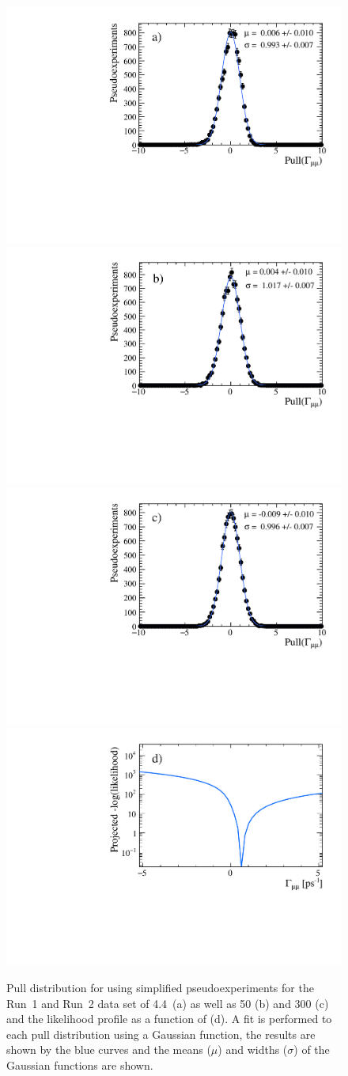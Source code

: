 
\begin{figure}[tbp]
    \centering
       \includegraphics[width=0.49 \textwidth]{./Figs/LifetimeMeasurement/CKM_simple_gamma_pull.pdf}
     \includegraphics[width= 0.49 \textwidth]{./Figs/LifetimeMeasurement/50fb_gamma_pull.pdf}
      \includegraphics[width=0.49 \textwidth]{./Figs/LifetimeMeasurement/300fb_simple_gamma_pull.pdf}
        \includegraphics[width= 0.49 \textwidth]{./Figs/LifetimeMeasurement/Gamma_LL.pdf}  

  \caption{Pull distribution for \Gmumu using simplified pseudoexperiments for the Run~1 and Run~2 data set of 4.4~\fb (a) as well as 50 (b) and 300 (c) \fb and the likelihood profile as a function of \Gmumu (d).  A fit is performed to each pull distribution using a Gaussian function, the results are shown by the blue curves and the means ($\mu$) and widths ($\sigma$) of the Gaussian functions are shown.}
    \label{fig:gammapulls}
\end{figure}




